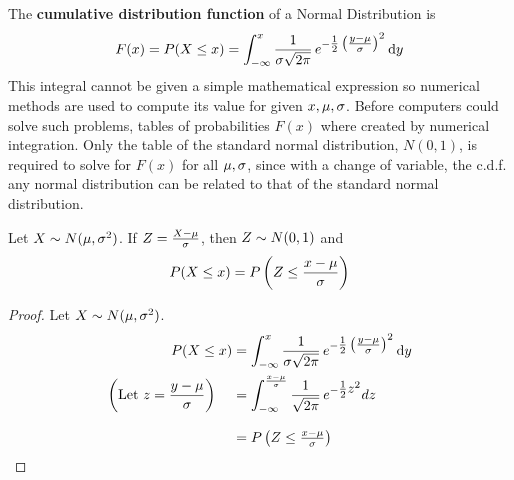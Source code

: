 The \textbf{cumulative distribution function} of a Normal Distribution is 
\[
    F(x) = P(X\le x) = \int_{-\infty}^x \frac{1}{\sigma\sqrt{2\pi}}\,
    e^{-\textstyle\frac{1}{2}\left(\frac{y - \mu}{\sigma}\right)^2} \operatorname{d}\!{y}
\]
This integral cannot be given a simple mathematical expression so numerical methods are used to compute its value for given $x,\mu,\sigma$. Before computers could solve such problems, tables of probabilities $F(x)$ where created by numerical integration. Only the table of the standard normal distribution, $N(0,1)$, is required to solve for $F(x)$ for all $\mu,\sigma$, since with a change of variable, the c.d.f. any normal distribution can be related to that of the standard normal distribution.
\begin{theorem}
Let $X \sim N(\mu,\sigma^2)$. If $Z = \frac{X - \mu}{\sigma}$, then $Z \sim N(0,1)$ and
\[
    P(X \le x) = P\left(Z \le \frac{x - \mu}{\sigma}\right)
\]
\end{theorem}
\begin{proof}
Let $X \sim N(\mu,\sigma^2)$.
\begin{align*}
    P(X\le x) 
    &= \int_{-\infty}^x \frac{1}{\sigma\sqrt{2\pi}}\,
        e^{-\textstyle\frac{1}{2}\left(\frac{y - \mu}{\sigma}\right)^2} \operatorname{d}\!{y} \\
    \left(\text{Let }z = \frac{y-\mu}{\sigma}\right)\hspace{12pt} 
    &= \int_{-\infty}^{\frac{x - \mu}{\sigma}} \frac{1}{\sqrt{2\pi}}\,
        e^{-\textstyle\frac{1}{2}z^2} dz \\[8pt plus 2pt minus 4pt]
    &= P\left(Z\le\textstyle\frac{x - \mu}{\sigma}\right)
\end{align*}
\end{proof}
